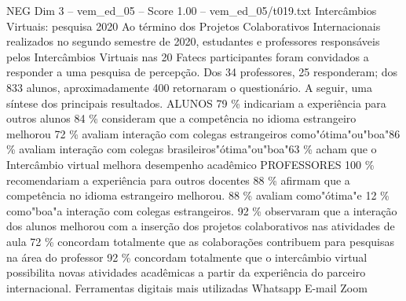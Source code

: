 \begin{textsample}{NEG Dim 3 – vem\_ed\_05 – Score 1.00 – vem\_ed\_05/t019.txt}  \label{ex:f3_neg_058}
Intercâmbios Virtuais: pesquisa 2020 Ao término dos Projetos Colaborativos Internacionais realizados no segundo semestre de 2020, estudantes e professores responsáveis pelos Intercâmbios Virtuais nas 20 Fatecs participantes foram convidados a responder a uma pesquisa de percepção.
Dos 34 professores, 25 responderam; dos 833 alunos, aproximadamente 400 retornaram o questionário.
A seguir, uma síntese dos principais resultados.
ALUNOS 79 \% indicariam a experiência para outros alunos 84 \% consideram que a competência no idioma estrangeiro melhorou 72 \% avaliam interação com colegas estrangeiros como"ótima"ou"boa"86 \% avaliam interação com colegas brasileiros"ótima"ou"boa"63 \% acham que o Intercâmbio virtual melhora desempenho acadêmico PROFESSORES 100 \% recomendariam a experiência para outros docentes 88 \% afirmam que a competência no idioma estrangeiro melhorou. 88 \% avaliam como"ótima"e 12 \% como"boa"a interação com colegas estrangeiros. 92 \% observaram que a interação dos alunos melhorou com a inserção dos projetos colaborativos nas atividades de aula 72 \% concordam totalmente que as colaborações contribuem para pesquisas na área do professor 92 \% concordam totalmente que o intercâmbio virtual possibilita novas atividades acadêmicas a partir da experiência do parceiro internacional.
Ferramentas digitais mais utilizadas Whatsapp E-mail Zoom

\end{textsample}
